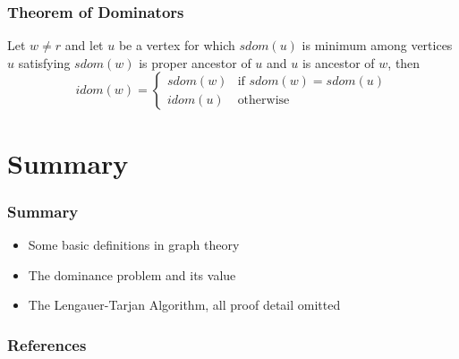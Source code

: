 \documentclass[]{beamer}
\begin{document}
\begin{frame}
  \frametitle{Theorem of Dominators}
  \begin{theorem}
    Let $w \neq r$ and let $u$ be a vertex for which $sdom(u)$ is minimum
     among vertices $u$ satisfying $sdom(w)$ is proper ancestor of $u$ and
     $u$ is ancestor of $w$, then
     \begin{equation*}
       idom(w)=\left\{
       \begin{array}{ll}
         {sdom(w)} &\text{if $sdom(w)=sdom(u)$}\\
         {idom(u)} &\text{otherwise}
       \end{array}  
       \right.
     \end{equation*}
  \end{theorem}
\end{frame}

\section{Summary}
\frame{\tableofcontents[currentsection]}

\begin{frame}
  \frametitle{Summary}
  \begin{itemize}
    \item Some basic definitions in graph theory
    \item The dominance problem and its value
    \item The Lengauer-Tarjan Algorithm, all proof detail omitted
  \end{itemize}
\end{frame}

\begin{frame}
  \frametitle{References}
  
  {\tiny }
\end{frame}

\end{document}
